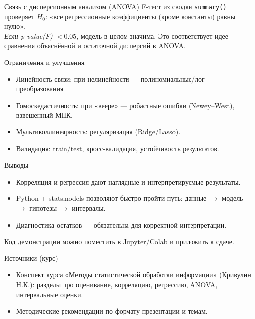 \documentclass{beamer}
\begin{document}
\begin{frame}{Связь с дисперсионным анализом (ANOVA)}
F-тест из сводки \texttt{summary()} проверяет $H_0$: «все регрессионные коэффициенты (кроме константы) равны нулю».\\[6pt]
\textit{Если p-value(F) $<0.05$}, модель в целом значима. Это соответствует идее сравнения объяснённой и остаточной дисперсий в ANOVA.
\end{frame}

\begin{frame}{Ограничения и улучшения}
\begin{itemize}
  \item Линейность связи: при нелинейности — полиномиальные/лог-преобразования.
  \item Гомоскедастичность: при «веере» — робастные ошибки (Newey–West), взвешенный МНК.
  \item Мультиколлинеарность: регуляризация (Ridge/Lasso).
  \item Валидация: train/test, кросс-валидация, устойчивость результатов.
\end{itemize}
\end{frame}

\begin{frame}{Выводы}
\begin{itemize}
  \item Корреляция и регрессия дают наглядные и интерпретируемые результаты.
  \item Python + statsmodels позволяют быстро пройти путь: данные $\to$ модель $\to$ гипотезы $\to$ интервалы.
  \item Диагностика остатков — обязательна для корректной интерпретации.
\end{itemize}
Код демонстрации можно поместить в Jupyter/Colab и приложить к сдаче.
\end{frame}

\begin{frame}{Источники (курс)}
\begin{itemize}
  \item Конспект курса «Методы статистической обработки информации» (Кривулин Н.К.): разделы про оценивание, корреляцию, регрессию, ANOVA, интервальные оценки.
  \item Методические рекомендации по формату презентации и темам.
\end{itemize}
\end{frame}
\end{document}
